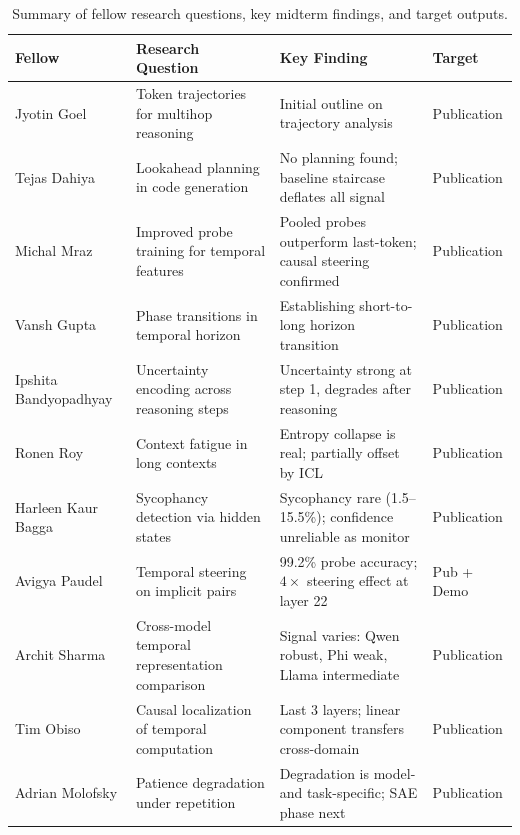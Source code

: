 \documentclass[midterm]{sparreport}
\begin{document}
\begin{table}[htbp]
\centering
\small
\begin{tabular}{p{2.2cm}p{4.5cm}p{4.5cm}p{2cm}}
\toprule
\textbf{Fellow} & \textbf{Research Question} & \textbf{Key Finding} & \textbf{Target} \\
\midrule
Jyotin Goel & Token trajectories for multihop reasoning & Initial outline on trajectory analysis & Publication \\
Tejas Dahiya & Lookahead planning in code generation & No planning found; baseline staircase deflates all signal & Publication \\
Michal Mraz & Improved probe training for temporal features & Pooled probes outperform last-token; causal steering confirmed & Publication \\
Vansh Gupta & Phase transitions in temporal horizon & Establishing short-to-long horizon transition & Publication \\
Ipshita Bandyopadhyay & Uncertainty encoding across reasoning steps & Uncertainty strong at step 1, degrades after reasoning & Publication \\
Ronen Roy & Context fatigue in long contexts & Entropy collapse is real; partially offset by ICL & Publication \\
Harleen Kaur Bagga & Sycophancy detection via hidden states & Sycophancy rare (1.5--15.5\%); confidence unreliable as monitor & Publication \\
Avigya Paudel & Temporal steering on implicit pairs & 99.2\% probe accuracy; $4\times$ steering effect at layer 22 & Pub + Demo \\
Archit Sharma & Cross-model temporal representation comparison & Signal varies: Qwen robust, Phi weak, Llama intermediate & Publication \\
Tim Obiso & Causal localization of temporal computation & Last 3 layers; linear component transfers cross-domain & Publication \\
Adrian Molofsky & Patience degradation under repetition & Degradation is model- and task-specific; SAE phase next & Publication \\
\bottomrule
\end{tabular}
\caption{Summary of fellow research questions, key midterm findings, and target outputs.}
\label{tab:fellows}
\end{table}

\end{document}
